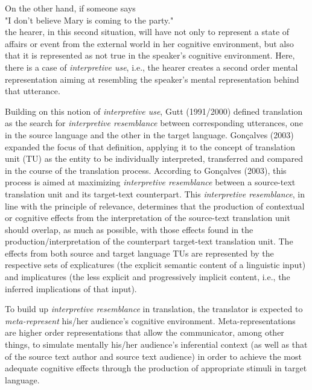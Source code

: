 \documentclass[output=paper]{langsci/langscibook}
\begin{document}
On the other hand, if someone says\\

"I don’t believe Mary is coming to the party."\\

the hearer, in this second situation, will have not only to represent a state of affairs or event from the external world in her cognitive environment, but also that it is represented as not true in the speaker’s cognitive environment. Here, there is a case of \textit{interpretive use}, i.e., the hearer creates a second order mental representation aiming at resembling the speaker’s mental representation behind that utterance. 


Building on this notion of \textit{interpretive use}, Gutt (1991/2000) defined translation as the search for \textit{interpretive resemblance }between corresponding utterances, one in the source language and the other in the target language. Gonçalves (2003) expanded the focus of that definition, applying it to the concept of translation unit (TU) as the entity to be individually interpreted, transferred and compared in the course of the translation process. According to Gonçalves (2003), this process is aimed at maximizing \textit{interpretive resemblance }between a source-text translation unit and its target-text counterpart. This \textit{interpretive resemblance}, in line with the principle of relevance, determines that the production of contextual or cognitive effects from the interpretation of the source-text translation unit should overlap, as much as possible, with those effects found in the production/interpretation of the counterpart target-text translation unit. The effects from both source and target language TUs are represented by the respective sets of explicatures (the explicit semantic content of a linguistic input) and implicatures (the less explicit and progressively implicit content, i.e., the inferred implications of that input).



To build up \textit{interpretive resemblance} in translation, the translator is expected to \textit{meta-represent} his/her audience’s cognitive environment. Meta-representations are higher order representations that allow the communicator, among other things, to simulate mentally his/her audience’s inferential context (as well as that of the source text author and source text audience) in order to achieve the most adequate cognitive effects through the production of appropriate stimuli in target language.  
\end{document}
